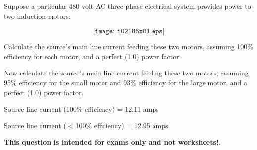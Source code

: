 

Suppose a particular 480 volt AC three-phase electrical system provides power to two induction motors:

$$\texttt{[image: i02186x01.eps]}$$

Calculate the source's main line current feeding these two motors, assuming 100\% efficiency for each motor, and a perfect (1.0) power factor.

\vskip 50pt

Now calculate the source's main line current feeding these two motors, assuming 95\% efficiency for the small motor and 93\% efficiency for the large motor, and a perfect (1.0) power factor.







Source line current (100\% efficiency) = 12.11 amps

\vskip 10pt

Source line current ($<$100\% efficiency) = 12.95 amps







{\bf This question is intended for exams only and not worksheets!}.


